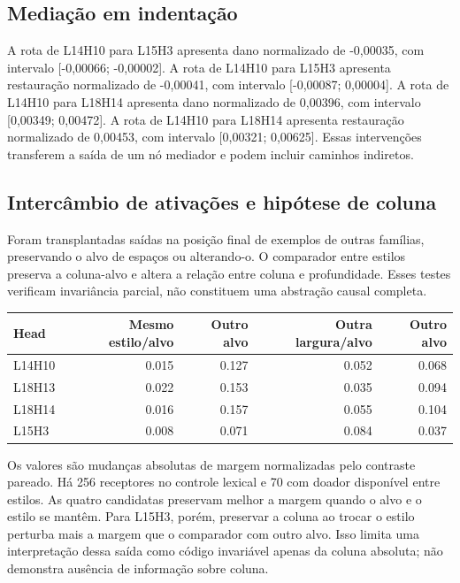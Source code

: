 \subsection{Mediação em indentação}
A rota de L14H10 para L15H3 apresenta dano normalizado de -0,00035, com intervalo [-0,00066; -0,00002]. 
A rota de L14H10 para L15H3 apresenta restauração normalizado de -0,00041, com intervalo [-0,00087; 0,00004]. 
A rota de L14H10 para L18H14 apresenta dano normalizado de 0,00396, com intervalo [0,00349; 0,00472]. 
A rota de L14H10 para L18H14 apresenta restauração normalizado de 0,00453, com intervalo [0,00321; 0,00625]. 
Essas intervenções transferem a saída de um nó mediador e podem incluir caminhos indiretos.

\subsection{Intercâmbio de ativações e hipótese de coluna}
Foram transplantadas saídas na posição final de exemplos de outras famílias, preservando o alvo de espaços ou alterando-o. O comparador entre estilos preserva a coluna-alvo e altera a relação entre coluna e profundidade. Esses testes verificam invariância parcial, não constituem uma abstração causal completa.

\begin{center}\small\begin{tabular}{lrrrr}\toprule
Head & Mesmo estilo/alvo & Outro alvo & Outra largura/alvo & Outro alvo \\ \midrule
L14H10 & 0.015 & 0.127 & 0.052 & 0.068 \\
L18H13 & 0.022 & 0.153 & 0.035 & 0.094 \\
L18H14 & 0.016 & 0.157 & 0.055 & 0.104 \\
L15H3 & 0.008 & 0.071 & 0.084 & 0.037 \\
\bottomrule\end{tabular}\end{center}
Os valores são mudanças absolutas de margem normalizadas pelo contraste pareado. Há 256 receptores no controle lexical e 70 com doador disponível entre estilos. As quatro candidatas preservam melhor a margem quando o alvo e o estilo se mantêm. Para L15H3, porém, preservar a coluna ao trocar o estilo perturba mais a margem que o comparador com outro alvo. Isso limita uma interpretação dessa saída como código invariável apenas da coluna absoluta; não demonstra ausência de informação sobre coluna.

